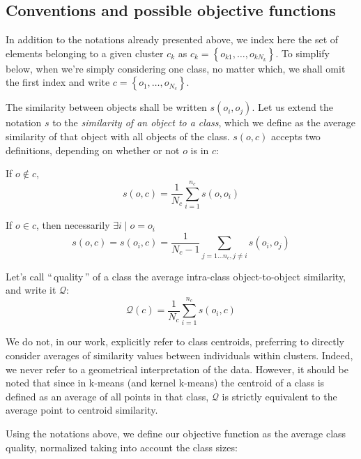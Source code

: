 \documentclass[a4paper,twoside]{article}
\newcommand{\gl}[1]{``\,#1\,''} %
\begin{document}
\subsection{Conventions and possible objective functions}

In addition to the notations already presented above, we index here the set of elements belonging to a given cluster $c_k$ as $c_k = \left\{o_{k1}, \ldots, o_{kN_k}\right\}$. To simplify below, when we're simply considering one class, no matter
which, we shall omit the first index and write $c = \left\{o_1, \ldots, o_{N_c}\right\}$.

The similarity between objects shall be written $s\left(o_i, o_j\right)$.
Let us extend the notation $s$ to the \emph{similarity of an object to a
  class}, which we define as the average similarity of that object
with all objects of the class. $s(o,c)$ accepts two definitions,
depending on whether or not $o$ is in $c$:

If $o \notin c$,
\begin{equation}
  s\left(o,c\right) = \frac{1}{N_c} \sum_{i=1}^{n_c}s\left(o, o_i\right)
   \label{eq:soc_notinclass}
\end{equation}

If $o \in c$, then necessarily $\exists i \mid o = o_i$
\begin{equation}
  s\left(o,c\right) = s\left(o_i, c\right) = \frac{1}{N_c-1} \sum_{j=1 \ldots n_c, j \neq i} s\left(o_i, o_j\right)
  	 \label{eq:soc_inclass}
\end{equation}

Let's call \gl{quality} of a class the average intra-class object-to-object similarity, and write it $\mathcal{Q}$:
\begin{equation}
\mathcal{Q}\left(c\right) = \frac{1}{N_c} \sum_{i=1}^{n_c} s\left(o_i, c\right)
\end{equation}

We do not, in our work, explicitly refer to class centroids, preferring to directly consider averages of similarity values between individuals within clusters. Indeed, we never refer to a geometrical interpretation of the data. However, it should be noted that since in k-means (and kernel k-means) the centroid of a class is defined as an average of all points in that class, $\mathcal{Q}$ is strictly equivalent to the average point to centroid similarity.

Using the notations above, we define our objective function as the average class quality, normalized taking into account the class sizes:
\end{document}

